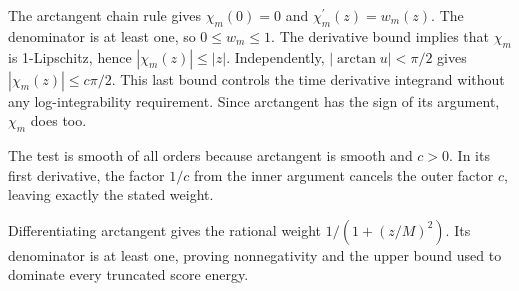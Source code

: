 \documentclass[11pt,a4paper]{article}
\begin{document}
The arctangent chain rule gives \(\chi_m(0)=0\) and \(\chi_m^{\prime}(z)=w_m(z)\). The denominator is at least one, so \(0\le w_m\le1\). The derivative bound implies that \(\chi_m\) is 1-Lipschitz, hence \(|\chi_m(z)|\le|z|\). Independently, \(|\arctan u|<\pi/2\) gives \(|\chi_m(z)|\le c\pi/2\). This last bound controls the time derivative integrand without any log-integrability requirement. Since arctangent has the sign of its argument, \(\chi_m\) does too.



The test is smooth of all orders because arctangent is smooth and \(c>0\). In its first derivative, the factor \(1/c\) from the inner argument cancels the outer factor \(c\), leaving exactly the stated weight.



Differentiating arctangent gives the rational weight \(1/(1+(z/M)^2)\). Its denominator is at least one, proving nonnegativity and the upper bound used to dominate every truncated score energy.
\end{document}
